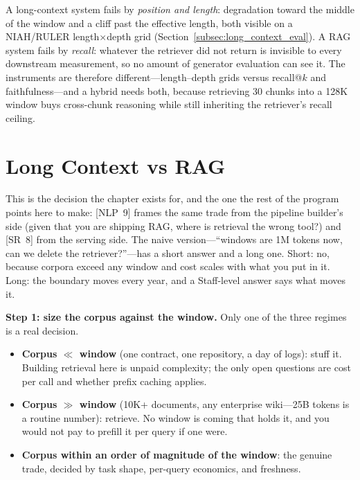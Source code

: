 \begin{keyinsight}
A long-context system fails by \emph{position and length}: degradation toward the middle of the window and a cliff past the effective length, both visible on a NIAH/RULER length$\times$depth grid (Section~\ref{subsec:long_context_eval}). A RAG system fails by \emph{recall}: whatever the retriever did not return is invisible to every downstream measurement, so no amount of generator evaluation can see it. The instruments are therefore different---length--depth grids versus recall@$k$ and faithfulness---and a hybrid needs both, because retrieving 30 chunks into a 128K window buys cross-chunk reasoning while still inheriting the retriever's recall ceiling.
\end{keyinsight}

\section{Long Context vs RAG}
\label{sec:long_context_vs_rag}

This is the decision the chapter exists for, and the one the rest of the program points here to make: [NLP~9] frames the same trade from the pipeline builder's side (given that you are shipping RAG, where is retrieval the wrong tool?) and [SR~8] from the serving side. The naive version---``windows are 1M tokens now, can we delete the retriever?''---has a short answer and a long one. Short: no, because corpora exceed any window and cost scales with what you put in it. Long: the boundary moves every year, and a Staff-level answer says what moves it.

\textbf{Step 1: size the corpus against the window.} Only one of the three regimes is a real decision.
\begin{itemize}
    \item \textbf{Corpus $\ll$ window} (one contract, one repository, a day of logs): stuff it. Building retrieval here is unpaid complexity; the only open questions are cost per call and whether prefix caching applies.
    \item \textbf{Corpus $\gg$ window} (10K+ documents, any enterprise wiki---25B tokens is a routine number): retrieve. No window is coming that holds it, and you would not pay to prefill it per query if one were.
    \item \textbf{Corpus within an order of magnitude of the window}: the genuine trade, decided by task shape, per-query economics, and freshness.
\end{itemize}

